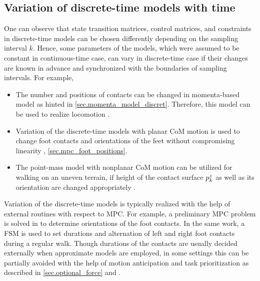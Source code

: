 \subsection{Variation of discrete-time models with time}\label{sec.discret_variation}

One can observe that state transition matrices, control matrices, and
constraints in discrete-time models can be chosen differently depending on the
sampling interval $k$. Hence, some parameters of the models, which were assumed
to be constant in continuous-time case, can vary in discrete-time case if their
changes are known in advance and synchronized with the boundaries of sampling
intervals. For example,
%
\begin{itemize}
    \item The number and positions of contacts can be changed in momenta-based
        model as hinted in \cref{sec.momenta_model_discret}. Therefore, this
        model can be used to realize locomotion \cite{Nagasaka2012,
        Audren2014iros}.

    \item Variation of the discrete-time models with planar \ac{CoM} motion is
        used to change foot contacts and orientations of the feet without
        compromising linearity \cite{Herdt2010auro},
        \cref{sec.mpc_foot_positions}.

    \item The point-mass model with nonplanar \ac{CoM} motion can be utilized
        for walking on an uneven terrain, if height of the contact surface
        $p^z_k$ as well as its orientation are changed appropriately
        \cite{Brasseur2015humanoids}.
\end{itemize}
%


Variation of the discrete-time models is typically realized with the help of
external routines with respect to \ac{MPC}. For example, a preliminary \ac{MPC}
problem is solved in \cite[Chapter~2]{Herdt2012thesis} to determine
orientations of the foot contacts. In the same work, a \ac{FSM} is used to set
durations and alternation of left and right foot contacts during a regular
walk. Though durations of the contacts are usually decided externally when
approximate models are employed, in some settings this can be partially avoided
with the help of motion anticipation and task prioritization as described in
\cref{sec.optional_force} and \cite{Sherikov2015humanoids}.



